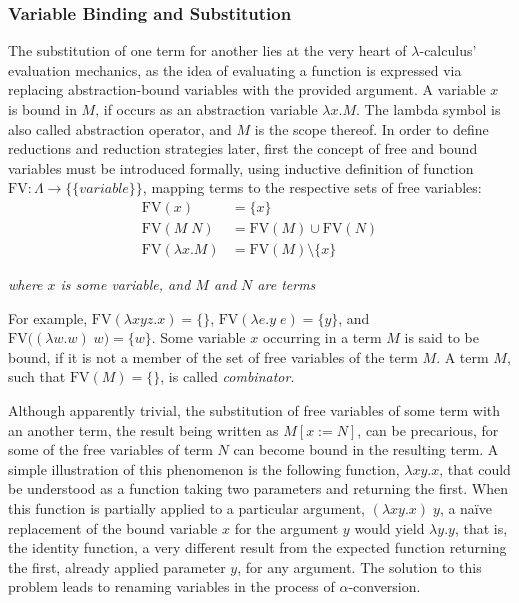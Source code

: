 \documentclass[a4paper,10pt]{article}
\begin{document}
\subsubsection{Variable Binding and Substitution}
The substitution of one term for another lies at the very heart of $\lambda$-calculus'
evaluation mechanics, as the idea of evaluating a function is expressed via replacing
abstraction-bound variables with the provided argument. A variable $x$ is bound in $M$,
if occurs as an abstraction variable $\lambda x.M$. The lambda symbol is also called
abstraction operator, and $M$ is the scope thereof. In order to define
reductions and reduction strategies later, first the concept of free
and bound variables must be introduced formally, using inductive definition
of function $\mathrm{FV} : \Lambda \to \big\{\{variable\}\big\}$, mapping 
terms to the respective sets of free variables:
\begin{align*}
	\mathrm{FV}(x) &= \{x\} \\
    \mathrm{FV}(M\;N) &= \mathrm{FV}(M) \cup \mathrm{FV}(N) \\
	\mathrm{FV}(\lambda x.M) &= \mathrm{FV}(M) \setminus \{x\}
\end{align*}
\begin{center}
\textit{where $x$ is some variable, and $M$ and $N$ are terms}
\end{center}
For example, $\mathrm{FV}(\lambda x y z.x) = \{\}$, $\mathrm{FV}(\lambda e.y\;e) = \{y\}$,
and $\mathrm{FV}\big((\lambda w.w)\;w\big) = \{w\}$. Some variable $x$ occurring in a term $M$ is
said to be bound, if it is not a member of the set of free variables of the term $M$.
A term $M$, such that $\mathrm{FV}(M) = \{\}$, is called \textit{combinator}.

Although apparently trivial, the substitution of free variables of some term with an another term,
the result being written as $M[x := N]$, can be precarious, for some of the 
free variables of term $N$ can become bound in the resulting term. A simple illustration of this
phenomenon is the following function, $\lambda xy.x$, that could be understood as a function
taking two parameters and returning the first. When this function is partially
applied to a particular argument, $(\lambda xy.x)\;y$, a na\"ive replacement of 
the bound variable $x$ for the argument $y$ would yield
$\lambda y.y$, that is, the identity function, a very different result from the expected function returning
the first, already applied parameter $y$, for any argument. The solution to this problem leads
to renaming variables in the process of $\alpha$-conversion.
\end{document}
